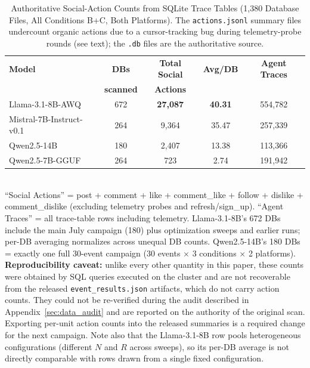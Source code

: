 \documentclass[11pt,journal,onecolumn]{IEEEtran}
\begin{document}
\begin{table}[!htbp]
\centering
\caption{Authoritative Social-Action Counts from SQLite Trace Tables (1,380 Database Files, All Conditions B+C, Both Platforms). The \texttt{actions.jsonl} summary files undercount organic actions due to a cursor-tracking bug during telemetry-probe rounds (see text); the \texttt{.db} files are the authoritative source.}
\label{tab:action_density_30event}
\small
\begin{tabular}{lcccc}
\toprule
\textbf{Model} & \textbf{DBs} & \textbf{Total Social} & \textbf{Avg/DB} & \textbf{Agent Traces} \\
 & \textbf{scanned} & \textbf{Actions} & & \\
\midrule
Llama-3.1-8B-AWQ  & 672 & \textbf{27,087} & \textbf{40.31} & 554,782 \\
Mistral-7B-Instruct-v0.1    & 264 & 9,364           & 35.47          & 257,339 \\
Qwen2.5-14B   & 180 & 2,407           & 13.38          & 113,366 \\
Qwen2.5-7B-GGUF   & 264 & 723             & 2.74           & 191,942 \\
\bottomrule
\end{tabular}
\smallskip \\
\footnotesize ``Social Actions'' = post + comment + like + comment\_like + follow + dislike + comment\_dislike (excluding telemetry probes and refresh/sign\_up). ``Agent Traces'' = all trace-table rows including telemetry. Llama-3.1-8B's 672 DBs include the main July campaign (180) plus optimization sweeps and earlier runs; per-DB averaging normalizes across unequal DB counts. Qwen2.5-14B's 180 DBs = exactly one full 30-event campaign (30 events $\times$ 3 conditions $\times$ 2 platforms). \textbf{Reproducibility caveat:} unlike every other quantity in this paper, these counts were obtained by SQL queries executed on the cluster and are not recoverable from the released \texttt{event\_results.json} artifacts, which do not carry action counts. They could not be re-verified during the audit described in Appendix~\ref{sec:data_audit} and are reported on the authority of the original scan. Exporting per-unit action counts into the released summaries is a required change for the next campaign. Note also that the Llama-3.1-8B row pools heterogeneous configurations (different $N$ and $R$ across sweeps), so its per-DB average is not directly comparable with rows drawn from a single fixed configuration.
\end{table}
\end{document}
